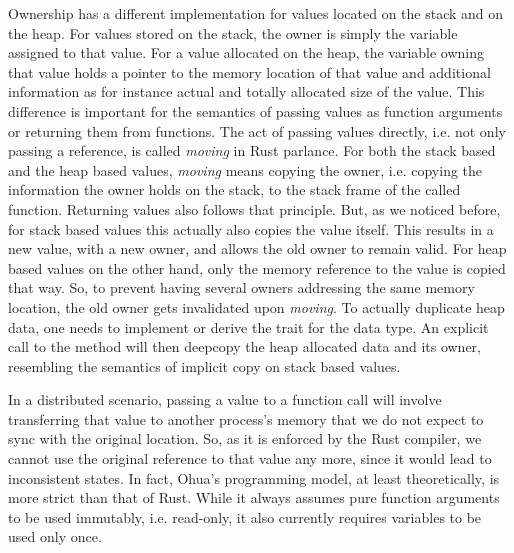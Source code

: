 Ownership has a different implementation for values located on the stack and on the heap. For values stored on the stack, the owner is simply the variable assigned to that value. For a value allocated on the heap, the variable owning that value holds a pointer to the memory location of that value and additional information as for instance actual and totally allocated size of the value. This difference is important for the semantics of passing values as function arguments or returning them from functions. The act of passing values directly, i.e. not only passing a reference, is called \emph{moving} in Rust parlance. For both the stack based and the heap based values, \emph{moving} means copying the owner, i.e. copying the information the owner holds on the stack, to the stack frame of the called function. Returning values also follows that principle. But, as we noticed before, for stack based values this actually also copies the value itself. This results in a new value, with a new owner, and allows the old owner to remain valid. For heap based values on the other hand, only the memory reference to the value is copied that way. So, to prevent having several owners addressing the same memory location, the old owner gets invalidated upon \emph{moving}. To actually duplicate heap data, one needs to implement or derive the  trait for the data type. An explicit call to the  method will then deepcopy the heap allocated data and its owner, resembling the semantics of implicit copy on stack based values.

In a distributed scenario, passing a value to a function call will involve transferring that value to another process's memory that we do not expect to sync with the original location. So, as it is enforced by the Rust compiler, we cannot use the original reference to that value any more, since it would lead to inconsistent states. In fact, Ohua's programming model, at least theoretically, is more strict than that of Rust. While it always assumes pure function arguments to be used immutably, i.e. read-only, it also currently requires variables to be used only once. 


